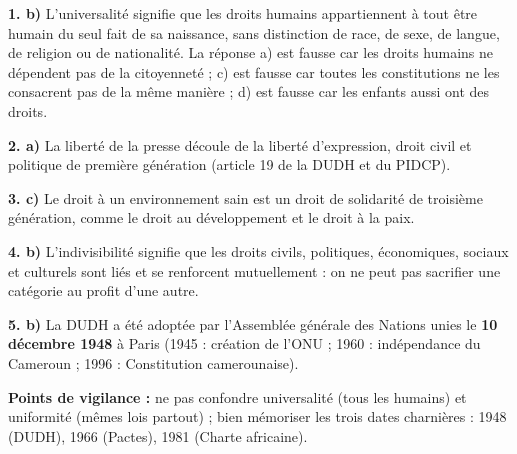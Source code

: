 \documentclass[11pt]{article}
\newcommand{\cle}[1]{{\popxbold\color{popdark}#1}}
\begin{document}
\begin{corrige}
\textbf{1. b)} L'\cle{universalité} signifie que les droits humains appartiennent à tout être humain du seul fait de sa naissance, sans distinction de race, de sexe, de langue, de religion ou de nationalité. La réponse a) est fausse car les droits humains ne dépendent pas de la citoyenneté ; c) est fausse car toutes les constitutions ne les consacrent pas de la même manière ; d) est fausse car les enfants aussi ont des droits.

\textbf{2. a)} La liberté de la presse découle de la liberté d'expression, droit civil et politique de \cle{première génération} (article 19 de la DUDH et du PIDCP).

\textbf{3. c)} Le droit à un environnement sain est un droit de solidarité de \cle{troisième génération}, comme le droit au développement et le droit à la paix.

\textbf{4. b)} L'\cle{indivisibilité} signifie que les droits civils, politiques, économiques, sociaux et culturels sont liés et se renforcent mutuellement : on ne peut pas sacrifier une catégorie au profit d'une autre.

\textbf{5. b)} La DUDH a été adoptée par l'Assemblée générale des Nations unies le \textbf{10 décembre 1948} à Paris (1945 : création de l'ONU ; 1960 : indépendance du Cameroun ; 1996 : Constitution camerounaise).

\textbf{Points de vigilance :} ne pas confondre universalité (tous les humains) et uniformité (mêmes lois partout) ; bien mémoriser les trois dates charnières : 1948 (DUDH), 1966 (Pactes), 1981 (Charte africaine).
\end{corrige}
\end{document}
